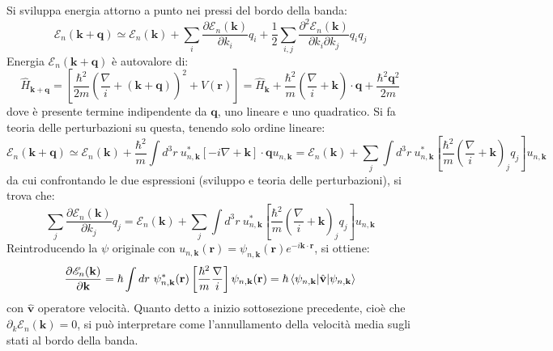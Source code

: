 \documentclass[10pt, a4paper]{scrartcl}
\numberwithin{equation}{subsection}
\theoremstyle{style1}
\theoremstyle{style2}
\begin{document}
Si sviluppa energia attorno a punto nei pressi del bordo della banda:
\[
\mathscr{E}_n(\mathbf{k} +\mathbf{q} ) \simeq \mathscr{E}_n (\mathbf{k} ) + \sum_{i} \frac{\partial \mathscr{E}_n(\mathbf{k} )}{\partial k_i} q_i +\frac{1}{2} \sum_{i,j}^{} \frac{\partial ^2 \mathscr{E}_n(\mathbf{k} )}{\partial k_i \partial k_j} q_iq_j
\] 
Energia $\mathscr{E}_n(\mathbf{k} +\mathbf{q} )$ \`e autovalore di:
\[
\hat{H}_{\mathbf{k} +\mathbf{q} }  = \left[ \frac{\hbar ^2}{2m} \left(\frac{\nabla}{i}  +(\mathbf{k} +\mathbf{q}) \right) ^2 + V(\mathbf{r} ) \right]= \hat{H}_\mathbf{k} + \frac{\hbar ^2}{m} \left(\frac{\nabla}{i}+\mathbf{k} \right) \cdot \mathbf{q} + \frac{\hbar ^2 \mathbf{q} ^2}{2m}
\] 
dove \`e presente termine indipendente da $\mathbf{q} $, uno lineare e uno quadratico. Si fa teoria delle perturbazioni su questa, tenendo solo ordine lineare:
\begin{equation*}
	\mathscr{E}_{n} (\mathbf{k} +\mathbf{q} )  \simeq \mathscr{E}_n(\mathbf{k} ) + \frac{\hbar ^2}{m}\int d^3 r \  u^*_{n,\mathbf{k} } \left[ -i \nabla +\mathbf{k}  \right] \cdot \mathbf{q} u_{n,\mathbf{k} } = \mathscr{E}_n(\mathbf{k} )+ \sum_{j}^{}\int d^3 r \  u^*_{n,\mathbf{k} } \left[ \frac{\hbar ^2}{m}\left(\frac{\nabla}{i} +\mathbf{k}\right)_j   q_j  \right]u_{n,\mathbf{k} }
\end{equation*}
da cui confrontando le due espressioni (sviluppo e teoria delle perturbazioni), si trova che:
\begin{equation}
	\sum_{j}^{} \frac{\partial \mathscr{E}_n(\mathbf{k} )}{\partial k_j}q_j= \mathscr{E}_n(\mathbf{k} )+ \sum_{j}^{}\int d^3 r \  u^*_{n,\mathbf{k} } \left[ \frac{\hbar ^2}{m}\left(\frac{\nabla}{i} +\mathbf{k}\right)_j   q_j  \right]u_{n,\mathbf{k} }
\end{equation}
Reintroducendo la $\psi $ originale con $u_{n,\mathbf{k} } (\mathbf{r}) = \psi _{n,\mathbf{k} } (\mathbf{r} )e^{-i\mathbf{k} \cdot \mathbf{r} } $, si ottiene:
\begin{equation}
	\frac{\partial \mathscr{E}_n(\mathbf{k} )}{\partial \mathbf{k} } = \hbar \int dr \ \psi ^*_{n,\mathbf{k} } (\mathbf{r} ) \left[ \frac{\hbar ^2}{m} \frac{\nabla}{i}  \right] \psi _{n,\mathbf{k} } (\mathbf{r} ) = \hbar \braket{\psi _{n,\mathbf{k} } |\hat{\mathbf{v} }|\psi_{n,\mathbf{k} } } 
\end{equation}
con $\hat{\mathbf{v} }$ operatore velocit\`a. Quanto detto a inizio sottosezione precedente, cio\`e che $\partial _k \mathscr{E}_n(\mathbf{k} ) = 0$, si pu\`o interpretare come l'annullamento della velocit\`a media sugli stati al bordo della banda.
\end{document}
